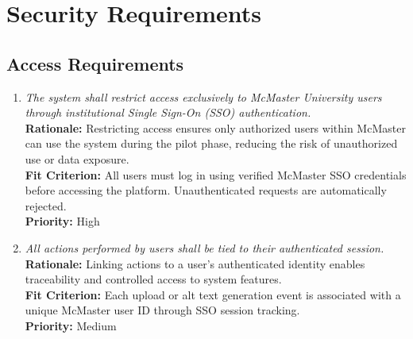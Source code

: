 \documentclass[12pt]{article}
\begin{document}
\section{Security Requirements}

\subsection{Access Requirements}
\begin{enumerate}[label=SR-AR \arabic*., wide=0pt, leftmargin=*]
\item \emph{The system shall restrict access exclusively to McMaster University users through institutional Single Sign-On (SSO) authentication.}\\[2mm] 
    {\bf Rationale:} Restricting access ensures only authorized users within McMaster can use the system during the pilot phase, reducing the risk of unauthorized use or data exposure.\\
    {\bf Fit Criterion:} All users must log in using verified McMaster SSO credentials before accessing the platform. Unauthenticated requests are automatically rejected.\\
    {\bf Priority:} High

\item \emph{All actions performed by users shall be tied to their authenticated session.}\\[2mm] 
    {\bf Rationale:} Linking actions to a user’s authenticated identity enables traceability and controlled access to system features.\\
    {\bf Fit Criterion:} Each upload or alt text generation event is associated with a unique McMaster user ID through SSO session tracking.\\
    {\bf Priority:} Medium
\end{enumerate}
\end{document}
